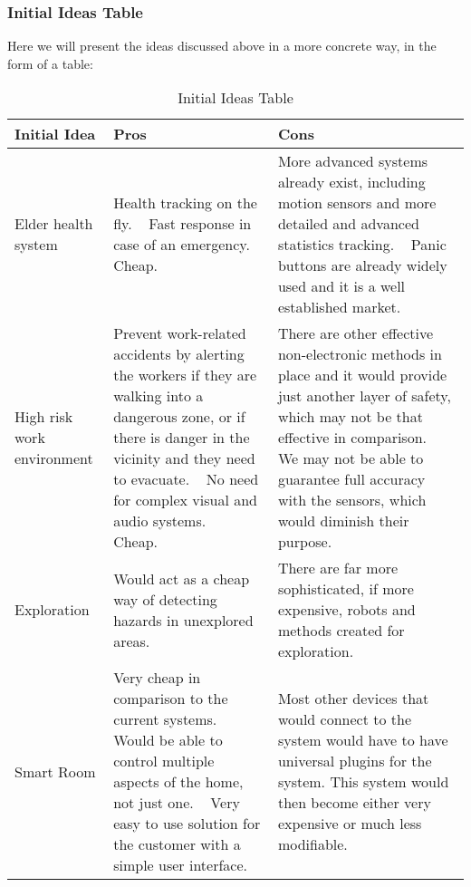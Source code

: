 \documentclass[../document]{subfiles}
\begin{document}
\subsubsection{Initial Ideas Table}
Here we will present the ideas discussed above in a more concrete way, in the form of a table:

\begin{table}[H]
\centering
\caption{Initial Ideas Table}
\begin{tabularx}{\textwidth}{|X|X|X|}
	\hline
	\textbf{Initial Idea}
	&\textbf{Pros}
	&\textbf{Cons}
	\\ \hline Elder health system
	&Health tracking on the fly.
	\newline \ \newline
	Fast response in case of an emergency.
	\newline \ \newline
	Cheap.
	&More advanced systems already exist, including motion sensors and more detailed and advanced statistics tracking.
	\newline \ \newline
	Panic buttons are already widely used and it is a well established market.
	\\ \hline High risk work environment
	&Prevent work-related accidents by alerting the workers if they are walking into a dangerous zone, or if there is danger in the vicinity and they need to evacuate.
	\newline \ \newline
	No need for complex visual and audio systems.
	\newline \ \newline
	Cheap.
	&There are other effective non-electronic methods in place and it would provide just another layer of safety, which may not be that effective in comparison.
	\newline \ \newline
	We may not be able to guarantee full accuracy with the sensors, which would diminish their purpose.
	\\ \hline Exploration
	&Would act as a cheap way of detecting hazards in unexplored areas.
	&There are far more sophisticated, if more expensive, robots and methods created for exploration.
	\\ \hline Smart Room
	&Very cheap in comparison to the current systems.
	\newline \ \newline
	Would be able to control multiple aspects of the home, not just one.
	\newline \ \newline
	Very easy to use solution for the customer with a simple user interface.
	&Most other devices that would connect to the system would have to have universal plugins for the system. This system would then become either very expensive or much less modifiable.
	\\ \hline 
\end{tabularx}
\end{table}
\end{document}
